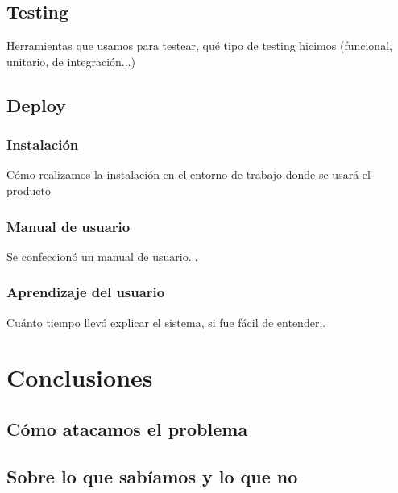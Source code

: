 \documentclass[a4paper,10pt]{article}
\begin{document}
\subsection{Testing}
Herramientas que usamos para testear, qué tipo de testing hicimos (funcional, unitario, de integración...)

\subsection{Deploy}
\subsubsection{Instalación}
Cómo realizamos la instalación en el entorno de trabajo donde se usará el producto
\subsubsection{Manual de usuario}
Se confeccionó un manual de usuario...
\subsubsection{Aprendizaje del usuario}
Cuánto tiempo llevó explicar el sistema, si fue fácil de entender..

\newpage 
\section{Conclusiones}
\subsection{Cómo atacamos el problema}
\subsection{Sobre lo que sabíamos y lo que no}




\newpage 

\end{document}
